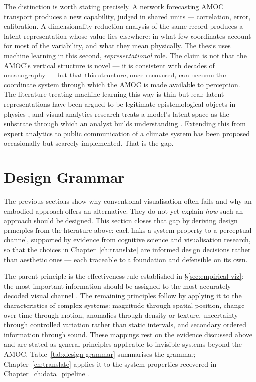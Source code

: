 The distinction is worth stating precisely. A network forecasting AMOC transport produces a new capability, judged in shared units --- correlation, error, calibration. A dimensionality-reduction analysis of the same record produces a latent representation whose value lies elsewhere: in what few coordinates account for most of the variability, and what they mean physically. The thesis uses machine learning in this second, \emph{representational} role. The claim is not that the AMOC's vertical structure is novel --- it is consistent with decades of oceanography \citep{hannachi2007, buckley2016} --- but that this structure, once recovered, can become the coordinate system through which the AMOC is made available to perception. The literature treating machine learning this way is thin but real: latent representations have been argued to be legitimate epistemological objects in physics \citep{iten2020}, and visual-analytics research treats a model's latent space as the substrate through which an analyst builds understanding \citep{sacha2018}. Extending this from expert analytics to public communication of a climate system has been proposed occasionally \citep{cabrera2023} but scarcely implemented. That is the gap.

\section{Design Grammar}
\label{sec:design-grammar}

The previous sections show why conventional visualisation often fails and why an embodied approach offers an alternative. They do not yet explain \emph{how} such an approach should be designed. This section closes that gap by deriving design principles from the literature above: each links a system property to a perceptual channel, supported by evidence from cognitive science and visualisation research, so that the choices in Chapter~\ref{ch:translate} are informed design decisions rather than aesthetic ones --- each traceable to a foundation and defensible on its own.

The parent principle is the effectiveness rule established in \S\ref{sec:empirical-viz}: the most important information should be assigned to the most accurately decoded visual channel \citep{bertin1983, clevelandmcgill1984, munzner2014}. The remaining principles follow by applying it to the characteristics of complex systems: magnitude through spatial position, change over time through motion, anomalies through density or texture, uncertainty through controlled variation rather than static intervals, and secondary ordered information through sound. These mappings rest on the evidence discussed above and are stated as general principles applicable to invisible systems beyond the AMOC. Table~\ref{tab:design-grammar} summarises the grammar; Chapter~\ref{ch:translate} applies it to the system properties recovered in Chapter~\ref{ch:data_pipeline}.


